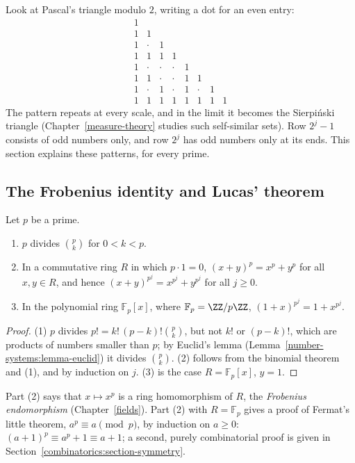 Look at Pascal's triangle modulo $2$, writing a dot for an even entry:
\[
\begin{array}{cccccccccccccccc}
1 \\
1 & 1 \\
1 & \cdot & 1 \\
1 & 1 & 1 & 1 \\
1 & \cdot & \cdot & \cdot & 1 \\
1 & 1 & \cdot & \cdot & 1 & 1 \\
1 & \cdot & 1 & \cdot & 1 & \cdot & 1 \\
1 & 1 & 1 & 1 & 1 & 1 & 1 & 1
\end{array}
\]
The pattern repeats at every scale, and in the limit it becomes the Sierpi\'nski triangle (Chapter~\ref{measure-theory} studies such self-similar sets). Row $2^j - 1$ consists of odd numbers only, and
row $2^j$ has odd numbers only at its ends. This section explains these patterns, for every prime.

\subsection{The Frobenius identity and Lucas' theorem}\label{combinatorics:subsection-lucas}

\begin{proposition}\label{combinatorics:proposition-prime-row}
Let $p$ be a prime.
\begin{enumerate}
\item $p$ divides $\binom{p}{k}$ for $0 < k < p$.
\item In a commutative ring $R$ in which $p \cdot 1 = 0$, $(x + y)^p = x^p + y^p$ for all $x, y \in R$, and hence $(x + y)^{p^j} = x^{p^j} + y^{p^j}$ for all $j \geq 0$.
\item In the polynomial ring $\mathbb{F}_p[x]$, where $\mathbb{F}_p = \ZZ/p\ZZ$, $(1 + x)^{p^j} = 1 + x^{p^j}$.
\end{enumerate}
\end{proposition}

\begin{proof}
(1) $p$ divides $p! = k!\,(p - k)!\binom{p}{k}$, but not $k!$ or $(p - k)!$, which are products of numbers smaller than $p$; by Euclid's lemma (Lemma~\ref{number-systems:lemma-euclid}) it divides
$\binom{p}{k}$. (2) follows from the binomial theorem and (1), and by induction on $j$. (3) is the case $R = \mathbb{F}_p[x]$, $y = 1$.
\end{proof}

Part (2) says that $x \mapsto x^p$ is a ring homomorphism of $R$, the \emph{Frobenius endomorphism} (Chapter~\ref{fields}). Part (2) with $R = \mathbb{F}_p$ gives a proof of Fermat's little theorem,
$a^p \equiv a \pmod p$, by induction on $a \geq 0$: $(a + 1)^p \equiv a^p + 1 \equiv a + 1$; a second, purely combinatorial proof is given in Section~\ref{combinatorics:section-symmetry}.

